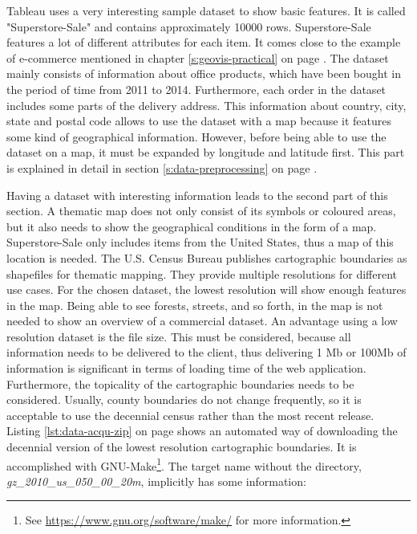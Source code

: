 Tableau uses a very interesting sample dataset to show basic features. It is called "Superstore-Sale" and contains approximately 10000 rows. Superstore-Sale features a lot of different attributes for each item. It comes close to the example of e-commerce mentioned in chapter \ref{s:geovis-practical} on page \pageref{s:geovis-practical}. The dataset mainly consists of information about office products, which have been bought in the period of time from 2011 to 2014. Furthermore, each order in the dataset includes some parts of the delivery address. This information about country, city, state and postal code allows to use the dataset with a map because it features some kind of geographical information. However, before being able to use the dataset on a map, it must be expanded by longitude and latitude first. This part is explained in detail in section \ref{s:data-preprocessing} on page \pageref{s:data-preprocessing}.

Having a dataset with interesting information leads to the second part of this section. A thematic map does not only consist of its symbols or coloured areas, but it also needs to show the geographical conditions in the form of a map. Superstore-Sale only includes items from the United States, thus a map of this location is needed. The U.S. Census Bureau publishes cartographic boundaries as shapefiles for thematic mapping. They provide multiple resolutions for different use cases. For the chosen dataset, the lowest resolution will show enough features in the map. Being able to see forests, streets, and so forth, in the map is not needed to show an overview of a commercial dataset. An advantage using a low resolution dataset is the file size. This must be considered, because all information needs to be delivered to the client, thus delivering 1 \ac{Mb} or 100\ac{Mb} of information is significant in terms of loading time of the web application.
Furthermore, the topicality of the cartographic boundaries needs to be considered. Usually, county boundaries do not change frequently, so it is acceptable to use the decennial census rather than the most recent release. Listing \ref{lst:data-acqu-zip} on page \pageref{lst:data-acqu-zip} shows an automated way of downloading the decennial version of the lowest resolution cartographic boundaries. It is accomplished with GNU-Make\footnote{See \href{https://www.gnu.org/software/make/}{https://www.gnu.org/software/make/} for more information.}. The target name without the directory, \textit{gz\_2010\_us\_050\_00\_20m}, implicitly has some information:

